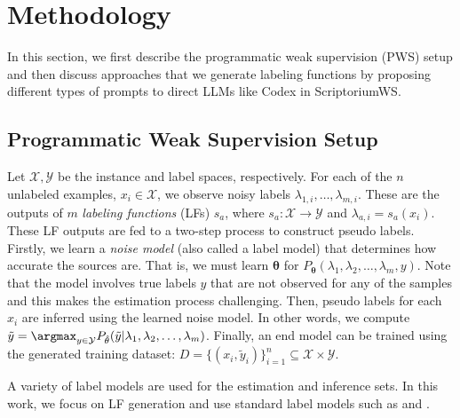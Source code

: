 \section{Methodology}
In this section, we first describe the programmatic weak supervision (PWS) setup and then discuss approaches that we generate labeling functions by proposing different types of prompts to direct LLMs like Codex in ScriptoriumWS.

\subsection{Programmatic Weak Supervision Setup}
Let $\mathcal{X}, \mathcal{Y}$ be the instance and label spaces,  respectively. 
For each of the $n$ unlabeled examples, $x_i \in \mathcal{X}$,  we observe noisy labels $\lambda_{1,i}, \ldots, \lambda_{m,i}$. 
These are the outputs of $m$ \emph{labeling functions} (LFs) $s_a$, where $s_a : \mathcal{X} \rightarrow \mathcal{Y}$ and $\lambda_{a,i} = s_a(x_i)$. 
These LF outputs are fed to  a two-step process to construct pseudo labels. 
Firstly, we learn a \emph{noise model} (also called a label model) that determines how accurate the sources are. That is, we must learn $\mathbf{\theta}$ for $P_{\mathbf{\theta}}(\lambda_{1}, \lambda_{2}, \ldots, \lambda_m, y)$. 
Note that the model involves true labels $y$ that are not observed for any of the samples and this makes the estimation process challenging. 
Then, pseudo labels for each $x_i$ are inferred using the learned noise model. In other words, we compute $\tilde{y} = \argmax_{y\in\mathcal{Y}} P_{\hat{\mathbf{\theta}}}(\tilde{y}|\lambda_{1}, \lambda_{2}, \ldots, \lambda_m)$. 
% 
Finally, an end model can be trained using the generated training dataset: $D=\{(x_i, \tilde{y}_i)\}_{i=1}^n \subseteq \mathcal{X} \times \mathcal{Y}$. 

A variety of label models are used for the estimation and inference sets.
%
In this work, we focus on LF generation and use standard label models such as \cite{ratner2019training} and \cite{fu2020fast}. 




